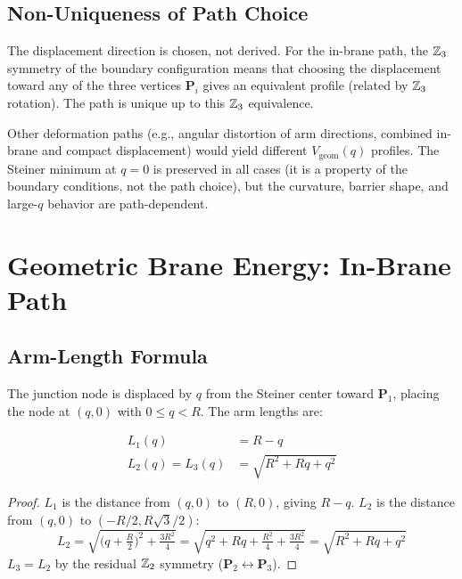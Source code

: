 \subsection{Non-Uniqueness of Path Choice}

The displacement direction is chosen, not derived. For the in-brane path,
the $\mathbb{Z}_3$ symmetry of the boundary configuration means that choosing
the displacement toward any of the three vertices $\mathbf{P}_i$ gives an
equivalent profile (related by $\mathbb{Z}_3$ rotation). The path is unique up
to this $\mathbb{Z}_3$ equivalence.

Other deformation paths (e.g., angular distortion of arm directions,
combined in-brane and compact displacement) would yield different
$V_{\mathrm{geom}}(q)$ profiles. The Steiner minimum at $q = 0$ is
preserved in all cases (it is a property of the boundary conditions,
not the path choice), but the curvature, barrier shape, and large-$q$
behavior are path-dependent.

\section{Geometric Brane Energy: In-Brane Path}
\label{sec:vq:inplane}

\subsection{Arm-Length Formula}

The junction node is displaced by $q$ from the Steiner center toward
$\mathbf{P}_1$, placing the node at $(q, 0)$ with $0 \leq q < R$. The
arm lengths are:

\begin{derivationbox}[title=Arm Lengths Along In-Brane Path]
    \begin{align}
        L_1(q) &= R - q
            \label{eq:L1_inplane} \\
        L_2(q) = L_3(q) &= \sqrt{R^2 + Rq + q^2}
            \label{eq:L23_inplane}
    \end{align}
    \tagDc
\end{derivationbox}

\begin{proof}
$L_1$ is the distance from $(q, 0)$ to $(R, 0)$, giving $R - q$.
$L_2$ is the distance from $(q, 0)$ to $(-R/2, R\sqrt{3}/2)$:
\begin{equation*}
    L_2 = \sqrt{\bigl(q + \tfrac{R}{2}\bigr)^2 + \tfrac{3R^2}{4}}
        = \sqrt{q^2 + Rq + \tfrac{R^2}{4} + \tfrac{3R^2}{4}}
        = \sqrt{R^2 + Rq + q^2}
\end{equation*}
$L_3 = L_2$ by the residual $\mathbb{Z}_2$ symmetry ($\mathbf{P}_2 \leftrightarrow \mathbf{P}_3$).
\end{proof}

